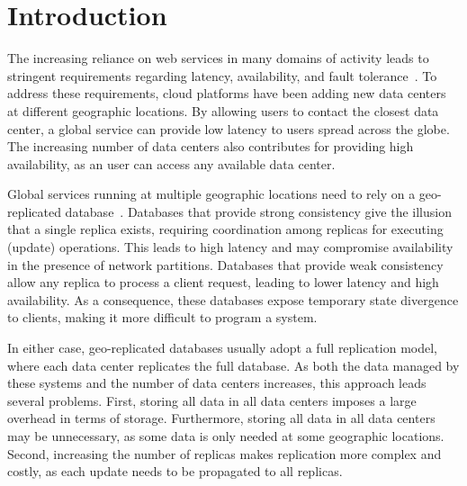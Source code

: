 \documentclass[sigplan,twocolumn,review,anonymous]{acmart}
\begin{document}
\section{Introduction}
\label{sec:introduction}


The increasing reliance on web services in many domains of activity leads to stringent requirements regarding latency, availability,
and fault tolerance~\cite{Schurman2009latency,gomez}.
To address these requirements, cloud platforms have been adding new data centers at different geographic 
locations. By allowing users to contact the closest data center, a global service can
provide low latency to users spread across the globe. 
The increasing number of data centers also contributes
for providing high availability,  as an user can access any
available data center.


Global services running at multiple geographic locations need 
to rely on a geo-replicated database~\cite{dynamo, hildred2023caerus, nguyen2023detock}.
Databases \cite{spanner,cockroachdb,mdcc} that provide strong consistency give the illusion that 
a single replica exists, requiring coordination among
replicas for executing (update) operations. This leads to high latency and may compromise 
availability in the presence of network partitions.
Databases that provide weak consistency~\cite{eventual,dynamo,cops} allow any replica to process a
client request, leading to lower latency and high availability. As a consequence, these databases expose
temporary state divergence to clients, making it more difficult to program a system. 

In either case, geo-replicated databases usually adopt a full replication model, where each data 
center replicates the full database. 
As both the data managed by these systems and the number of data centers increases,
this approach leads several problems.
First, storing all data in all data centers imposes a large overhead in terms of storage. 
Furthermore, storing all data in all data centers may be unnecessary, as some data is only needed at some
geographic locations.
Second, increasing the number of replicas makes replication 
more complex and costly, 
as each update needs to be propagated to all replicas.
\end{document}

